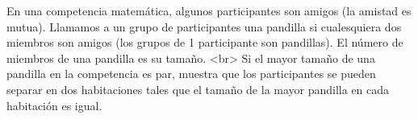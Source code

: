 En una competencia matemática, algunos participantes son amigos (la amistad es mutua). Llamamos a un grupo de participantes una pandilla si cualesquiera dos miembros son amigos (los grupos de 1 participante son pandillas). El número de miembros de una pandilla es su tamaño. <br>
Si el mayor tamaño de una pandilla en la competencia es par, muestra que los participantes se pueden separar en dos habitaciones tales que el tamaño de la mayor pandilla en cada habitación es igual.